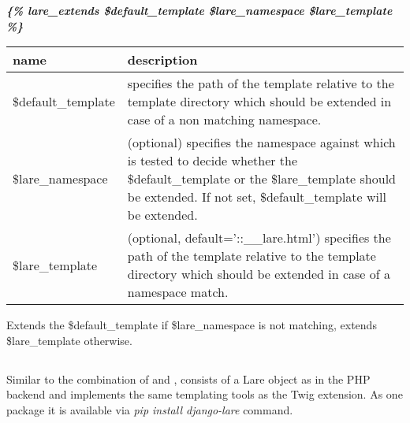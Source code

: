 \large{\textbf{\textit{\{\% lare\_extends \$default\_template \$lare\_namespace \$lare\_template \%\}}}}
\\
\begin{tabular}{|p{4cm}|p{9cm}|}
    \hline
    \textbf{name} & \textbf{description} \\
    \hline
    \$default\_template & specifies the path of the template relative to the template directory which should be extended in case of a non matching namespace. \\
    \hline
    \$lare\_namespace & (optional) specifies the namespace against which is tested to decide whether the \$default\_template or the \$lare\_template should be extended. If not set, \$default\_template will be extended. \\
    \hline
    \$lare\_template & (optional, default='::\_\_lare.html') specifies the path of the template relative to the template directory which should be extended in case of a name\-space match. \\
    \hline
\end{tabular}

\noindent{}Extends the \$default\_template if \$lare\_namespace is not matching, extends \$lare\_template otherwise.


\subsection{\DjangoLare{}}
Similar to the combination of \phpLare{} and \twigLare{}, \djangoLare{} consists of a Lare object as in the PHP backend and implements the same templating tools as the Twig extension.
As one package it is available via \emph{pip install django-lare} command.

